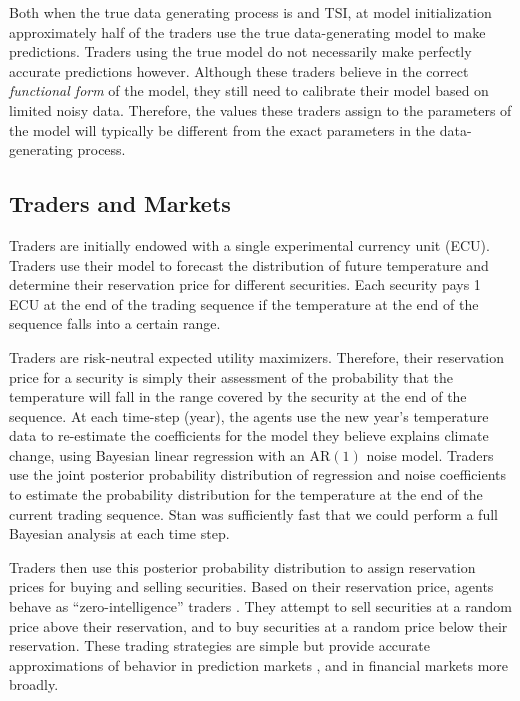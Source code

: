 \documentclass{article}\usepackage[]{graphicx}\usepackage[]{color}
\newcommand{\AR}{\text{AR}}
\begin{document}
Both when the true data generating process is  and TSI, at model initialization approximately half of the traders use the true data-generating model to make predictions. 
Traders using the true model do not necessarily make perfectly accurate predictions however. 
Although these traders believe in the correct \emph{functional form\/} of the model, they still need to calibrate their model based on limited noisy data. 
Therefore, the values these traders assign to the parameters of the model will typically be different from the exact parameters in the data-generating process.

\subsection{Traders and Markets}

Traders are initially endowed with a single experimental currency unit (ECU). 
Traders use their model to forecast the distribution of future temperature and determine their reservation price for different securities. Each security pays 1 ECU at the end of the trading sequence if the temperature at the end of the sequence falls into a certain range.

Traders are risk-neutral expected utility maximizers. 
Therefore, their reservation price for a security is simply their assessment of the probability that the temperature will fall in the range covered by the security at the end of the sequence.
At each time-step (year), the agents use the new year's temperature data to re-estimate the coefficients for the model they believe explains climate change, using Bayesian linear regression with an $\AR(1)$ noise model. Traders use the joint posterior probability distribution of regression and noise coefficients to estimate the probability distribution for the  temperature at the end of the current trading sequence. Stan was sufficiently fast that we could perform a full Bayesian analysis at each time step.

Traders then use this posterior probability distribution to assign reservation prices for buying and selling securities. 
Based on their reservation price, agents behave as ``zero-intelligence'' traders .
They attempt to sell securities at a random price above their reservation, and to buy securities at a random price below their reservation.
These trading strategies are simple but provide accurate approximations of behavior in prediction markets , and in financial markets more broadly.
\end{document}
